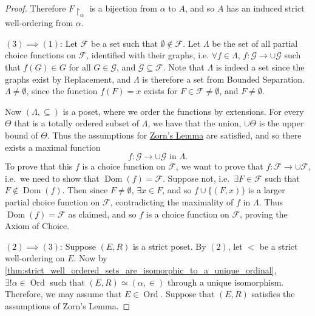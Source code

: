 \documentclass[notoc,notitlepage]{tufte-book}
\DeclareMathOperator{\Ord}{Ord }
\DeclareMathOperator{\Dom}{Dom }
\begin{document}
\begin{proof}
  Therefore $F \restriction_\alpha$ is a bijection from $\alpha$ to $A$, and so $A$ has an induced strict well-ordering from $\alpha$.

  \noindent$(3) \implies (1)$: Let $\mathcal{F}$ be a set such that $\emptyset \notin \mathcal{F}$. Let $\Lambda$ be the set of all partial choice functions on $\mathcal{F}$, identified with their graphs, i.e. $\forall f \in \Lambda$, $f : \mathcal{G} \to \cup \mathcal{G}$ such that $f(G) \in G$ for all $G \in \mathcal{G}$, and $\mathcal{G} \subseteq \mathcal{F}$. Note that $\Lambda$ is indeed a set since the graphs exist by Replacement, and $\Lambda$ is therefore a set from Bounded Separation. $\Lambda \neq \emptyset$, since the function $f(F) = x$ exists for $F \in \mathcal{F} \neq \emptyset$, and $F \neq \emptyset$.

  Now $(\Lambda, \subseteq)$ is a poset, where we order the functions by extensions. For every $\Theta$ that is a totally ordered subset of $\Lambda$, we have that the union, $\cup \Theta$ is the upper bound of $\Theta$. Thus the assumptions for \hyperref[item:zorn_s_lemma]{Zorn's Lemma} are satisfied, and so there exists a maximal function
  \begin{equation*}
    f : \mathcal{G} \to \cup \mathcal{G} \text{ in } \Lambda.
  \end{equation*}
  To prove that this $f$ is a choice function on $\mathcal{F}$, we want to prove that $f : \mathcal{F} \to \cup \mathcal{F}$, i.e.\ we need to show that $\Dom(f) = \mathcal{F}$. Suppose not, i.e.\ $\exists F \in \mathcal{F}$ such that $F \notin \Dom(f)$. Then since $F \neq \emptyset$, $\exists x \in F$, and so $f \cup \{ (F, x) \}$ is a larger partial choice function on $\mathcal{F}$, contradicting the maximality of $f$ in $\Lambda$. Thus $\Dom(f) = \mathcal{F}$ as claimed, and so $f$ is a choice function on $\mathcal{F}$, proving the Axiom of Choice.

  \noindent$(2) \implies (3)$: Suppose $(E, R)$ is a strict poset. By $(2)$, let $<$ be a strict well-ordering on $E$. Now by \cref{thm:strict_well_ordered_sets_are_isomorphic_to_a_unique_ordinal}, $\exists! \alpha \in \Ord$ such that $(E, R) \simeq (\alpha, \in)$ through a unique isomorphism. Therefore, we may assume that $E \in \Ord$. Suppose that $(E, R)$ satisfies the assumptions of Zorn's Lemma.
  

\end{proof}
\end{document}
